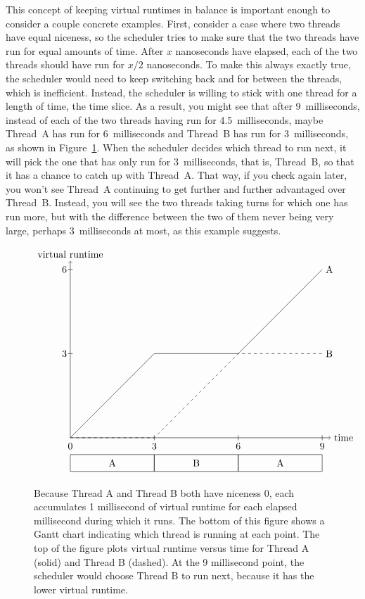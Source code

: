 This concept of keeping virtual runtimes in balance is important enough
to consider a couple concrete examples.
First, consider a case where two threads have equal niceness, so the scheduler tries to make
sure that the two threads have run for equal amounts of time. After $x$
nanoseconds have elapsed, each of the two threads should have run for $x/2$
nanoseconds.  To make this always exactly true, the scheduler would need to
keep switching back and for between the threads, which is inefficient.  Instead, the scheduler is willing to stick with one thread for a length of
time, the time slice.  As a result, you might see that after 9~milliseconds,
instead of each of the two threads having run for 4.5~milliseconds, maybe
Thread~A has run for 6~milliseconds and Thread~B has run for 3~milliseconds,
as shown in Figure~\ref{equal-virtual-runtime-figure}.  When the scheduler decides which thread to run next, it
will pick the one that has only run for 3~milliseconds, that is, Thread~B,
so that it has a chance to catch up with Thread~A.  That way, if you check
again later, you won't see Thread~A continuing to get further and further
advantaged over Thread~B.  Instead, you will see the two threads taking
turns for which one has run more, but with the difference between the two of
them never being very large, perhaps 3~milliseconds at most, as this
example suggests.
\begin{figure}
\[\begin{tikzpicture}[scale=.03]
\draw (0,0) rectangle (100,20);
\draw (100,0) rectangle (200,20);
\draw (200,0) rectangle (300,20);
\draw (50,10) node{A};
\draw (150,10) node{B};
\draw (250,10) node{A};
\draw (0,30) node{0};
\draw (100,30) node{3};
\draw (100,37) -- (100,43);
\draw (200,30) node{6};
\draw (200,37) -- (200,43);
\draw (300,30) node{9};
\draw (300,37) -- (300,43);
\draw[->] (0,40) -- (310,40) node[right] {time};
\draw[->] (0,40) -- (0,250) node[above] {virtual runtime};
\draw (0,40) -- (100,140) -- (200,140) -- (300, 240) node[right] {A};
\draw[dashed] (0,40) -- (100,40) -- (200,140) -- (300, 140) node[right] {B};
\draw (-7,140) node{3};
\draw (-3,140) -- (3,140);
\draw (-7,240) node{6};
\draw (-3,240) -- (3,240);
\end{tikzpicture}\]
\caption{Because Thread A and Thread B both have niceness 0, each accumulates 1 millisecond of virtual
runtime for each elapsed millisecond during which it runs.  The bottom of this figure shows a Gantt
chart indicating which thread is running at each point.  The top of the figure plots virtual runtime versus time
for Thread A (solid) and Thread B (dashed). At the 9 millisecond point, the scheduler would choose
Thread B to run next, because it has the lower virtual runtime.}\label{equal-virtual-runtime-figure}
\end{figure}


